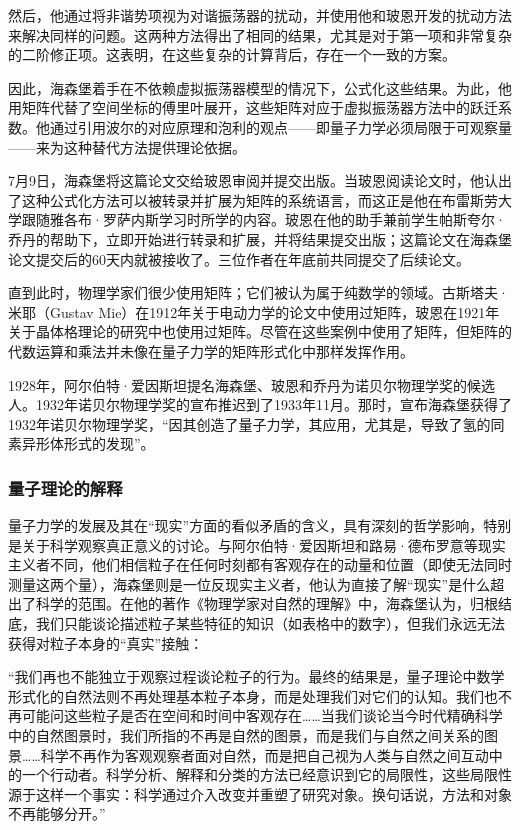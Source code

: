 然后，他通过将非谐势项视为对谐振荡器的扰动，并使用他和玻恩开发的扰动方法来解决同样的问题。这两种方法得出了相同的结果，尤其是对于第一项和非常复杂的二阶修正项。这表明，在这些复杂的计算背后，存在一个一致的方案。

因此，海森堡着手在不依赖虚拟振荡器模型的情况下，公式化这些结果。为此，他用矩阵代替了空间坐标的傅里叶展开，这些矩阵对应于虚拟振荡器方法中的跃迁系数。他通过引用波尔的对应原理和泡利的观点——即量子力学必须局限于可观察量——来为这种替代方法提供理论依据。

7月9日，海森堡将这篇论文交给玻恩审阅并提交出版。当玻恩阅读论文时，他认出了这种公式化方法可以被转录并扩展为矩阵的系统语言，而这正是他在布雷斯劳大学跟随雅各布·罗萨内斯学习时所学的内容。玻恩在他的助手兼前学生帕斯夸尔·乔丹的帮助下，立即开始进行转录和扩展，并将结果提交出版；这篇论文在海森堡论文提交后的60天内就被接收了。三位作者在年底前共同提交了后续论文。

直到此时，物理学家们很少使用矩阵；它们被认为属于纯数学的领域。古斯塔夫·米耶（Gustav Mie）在1912年关于电动力学的论文中使用过矩阵，玻恩在1921年关于晶体格理论的研究中也使用过矩阵。尽管在这些案例中使用了矩阵，但矩阵的代数运算和乘法并未像在量子力学的矩阵形式化中那样发挥作用。

1928年，阿尔伯特·爱因斯坦提名海森堡、玻恩和乔丹为诺贝尔物理学奖的候选人。1932年诺贝尔物理学奖的宣布推迟到了1933年11月。那时，宣布海森堡获得了1932年诺贝尔物理学奖，“因其创造了量子力学，其应用，尤其是，导致了氢的同素异形体形式的发现”。
\subsubsection{量子理论的解释}
量子力学的发展及其在“现实”方面的看似矛盾的含义，具有深刻的哲学影响，特别是关于科学观察真正意义的讨论。与阿尔伯特·爱因斯坦和路易·德布罗意等现实主义者不同，他们相信粒子在任何时刻都有客观存在的动量和位置（即使无法同时测量这两个量），海森堡则是一位反现实主义者，他认为直接了解“现实”是什么超出了科学的范围。在他的著作《物理学家对自然的理解》中，海森堡认为，归根结底，我们只能谈论描述粒子某些特征的知识（如表格中的数字），但我们永远无法获得对粒子本身的“真实”接触：

“我们再也不能独立于观察过程谈论粒子的行为。最终的结果是，量子理论中数学形式化的自然法则不再处理基本粒子本身，而是处理我们对它们的认知。我们也不再可能问这些粒子是否在空间和时间中客观存在……当我们谈论当今时代精确科学中的自然图景时，我们所指的不再是自然的图景，而是我们与自然之间关系的图景……科学不再作为客观观察者面对自然，而是把自己视为人类与自然之间互动中的一个行动者。科学分析、解释和分类的方法已经意识到它的局限性，这些局限性源于这样一个事实：科学通过介入改变并重塑了研究对象。换句话说，方法和对象不再能够分开。”
